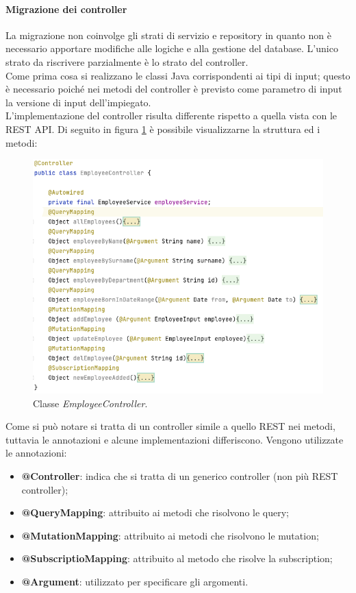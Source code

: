 \paragraph{Migrazione dei controller}
La migrazione non coinvolge gli strati di servizio e repository in quanto non è necessario apportare modifiche alle logiche e alla gestione del database. L'unico strato da riscrivere parzialmente è lo strato del controller.\\
Come prima cosa si realizzano le classi Java corrispondenti ai tipi di input; questo è necessario poiché nei metodi del controller è previsto come parametro di input la versione di input dell'impiegato.\\
L'implementazione del controller risulta differente rispetto a quella vista con le REST API. Di seguito in figura \ref{graphql-controller} è possibile visualizzarne la struttura ed i metodi:
\FloatBarrier
\begin{figure}[!ht]
\centering
\includegraphics[width=0.8\linewidth]{immagini/graphQLEmployeeController.png}
\caption{Classe \textit{EmployeeController}.}
\label{graphql-controller}
\end{figure}
\FloatBarrier
Come si può notare si tratta di un controller simile a quello REST nei metodi, tuttavia le annotazioni e alcune implementazioni differiscono. Vengono utilizzate le annotazioni:
\begin{itemize}
  \item \textbf{@Controller}: indica che si tratta di un generico controller (non più REST controller);
  \item \textbf{@QueryMapping}: attribuito ai metodi che risolvono le query;
  \item \textbf{@MutationMapping}: attribuito ai metodi che risolvono le mutation;
  \item \textbf{@SubscriptioMapping}: attribuito al metodo che risolve la subscription;
  \item \textbf{@Argument}: utilizzato per specificare gli argomenti.
\end{itemize}
